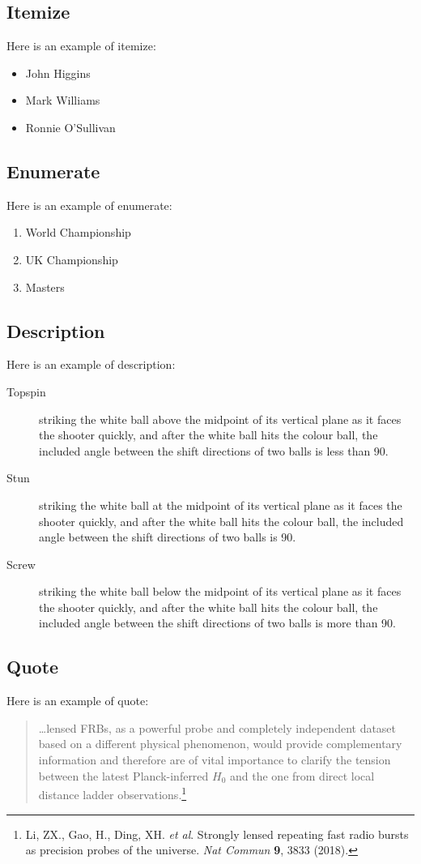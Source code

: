 \documentclass{article}
\begin{document}
    \subsection{Itemize}
    Here is an example of itemize:
    \begin{itemize}
        \item John Higgins
        \item Mark Williams
        \item Ronnie O'Sullivan
    \end{itemize}
    \subsection{Enumerate}
    Here is an example of enumerate:
    \begin{enumerate}
        \item World Championship
        \item UK Championship
        \item Masters
    \end{enumerate}
    \subsection{Description}
    Here is an example of description:
    \begin{description}
        \item[Topspin] striking the white ball above the midpoint of its
        vertical plane as it faces the shooter quickly, and after the white
        ball hits the colour ball, the included angle between the shift
        directions of two balls is less than 90\textdegree{}.
        \item[Stun] striking the white ball at the midpoint of its vertical
        plane as it faces the shooter quickly, and after the white ball hits
        the colour ball, the included angle between the shift directions of two
        balls is 90\textdegree{}.
        \item[Screw] striking the white ball below the midpoint of its vertical
        plane as it faces the shooter quickly, and after the white ball hits
        the colour ball, the included angle between the shift directions of two
        balls is more than 90\textdegree{}.
    \end{description}
    \subsection{Quote}
    Here is an example of quote:
    \begin{quote}
        \dots lensed FRBs, as a powerful probe and completely independent
        dataset based on a different physical phenomenon, would provide
        complementary information and therefore are of vital importance to
        clarify the tension between the latest Planck-inferred $H_0$ and the
        one from direct local distance ladder observations.\footnote{
            Li, ZX., Gao, H., Ding, XH. \textit{et al}. Strongly lensed
            repeating fast radio bursts as precision probes of the universe.
            \textit{Nat Commun} \textbf{9}, 3833 (2018).}
    \end{quote}
\end{document}
